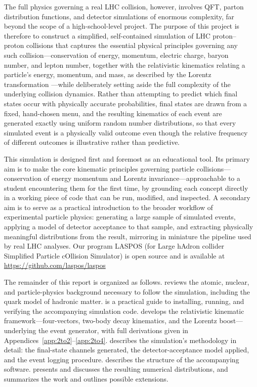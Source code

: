 \documentclass{article}
\begin{document}
\par The full physics governing a real LHC collision, however, involves QFT, parton distribution functions, and detector simulations of enormous complexity, far beyond the scope of a high-school-level project. The purpose of this project is therefore to construct a simplified, self-contained simulation of LHC proton--proton collisions that captures the essential physical principles governing any such collision---conservation of energy, momentum, electric charge, baryon number, and lepton number, together with the relativistic kinematics relating a particle's energy, momentum, and mass, as described by the Lorentz transformation \cite{jackson1998}---while deliberately setting aside the full complexity of the underlying collision dynamics. Rather than attempting to predict which final states occur with physically accurate probabilities, final states are drawn from a fixed, hand-chosen menu, and the resulting kinematics of each event are generated exactly using uniform random number distributions, so that every simulated event is a physically valid outcome even though the relative frequency of different outcomes is illustrative rather than predictive.
\par This simulation is designed first and foremost as an educational tool. Its primary aim is to make the core kinematic principles governing particle collisions---conservation of energy momentum and Lorentz invariance---approachable to a student encountering them for the first time, by grounding each concept directly in a working piece of code that can be run, modified, and inspected. A secondary aim is to serve as a practical introduction to the broader workflow of experimental particle physics: generating a large sample of simulated events, applying a model of detector acceptance to that sample, and extracting physically meaningful distributions from the result, mirroring in miniature the pipeline used by real LHC analyses. Our program LASPOS (for Large hAdron collider Simplified Particle cOllision Simulator) is open source and is available at \url{https://github.com/laspos/laspos}
\par The remainder of this report is organized as follows.  reviews the atomic, nuclear, and particle-physics background necessary to follow the simulation, including the quark model of hadronic matter.  is a practical guide to installing, running, and verifying the accompanying simulation code.  develops the relativistic kinematic framework---four-vectors, two-body decay kinematics, and the Lorentz boost---underlying the event generator, with full derivations given in Appendices~\ref{app:2to2}--\ref{app:2to4}.  describes the simulation's methodology in detail: the final-state channels generated, the detector-acceptance model applied, and the event logging procedure.  describes the structure of the accompanying software.  presents and discusses the resulting numerical distributions, and  summarizes the work and outlines possible extensions.
\end{document}
